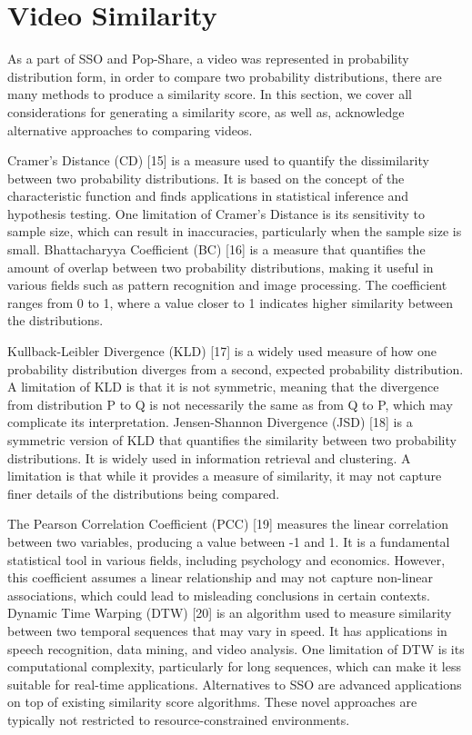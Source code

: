 \section{Video Similarity}

As a part of SSO and Pop-Share, a video was represented in probability distribution form, in order to compare two probability distributions, there are many methods to produce a similarity score. In this section, we cover all considerations for generating a similarity score, as well as, acknowledge alternative approaches to comparing videos.

Cramer’s Distance (CD) [15] is a measure used to quantify the dissimilarity between two probability distributions. It is based on the concept of the characteristic function and finds applications in statistical inference and hypothesis testing. One limitation of Cramer’s Distance is its sensitivity to sample size, which can result in inaccuracies, particularly when the sample size is small.
Bhattacharyya Coefficient (BC) [16] is a measure that quantifies the amount of overlap between two probability distributions, making it useful in various fields such as pattern recognition and image processing. The coefficient ranges from 0 to 1, where a value closer to 1 indicates higher similarity between the distributions.

Kullback-Leibler Divergence (KLD) [17] is a widely used measure of how one probability distribution diverges from a second, expected probability distribution. A limitation of KLD is that it is not symmetric, meaning that the divergence from distribution P to Q is not necessarily the same as from Q to P, which may complicate its interpretation.
Jensen-Shannon Divergence (JSD) [18] is a symmetric version of KLD that quantifies the similarity between two probability distributions. It is widely used in information retrieval and clustering. A limitation is that while it provides a measure of similarity, it may not capture finer details of the distributions being compared.

The Pearson Correlation Coefficient (PCC) [19] measures the linear correlation between two variables, producing a value between -1 and 1. It is a fundamental statistical tool in various fields, including psychology and economics. However, this coefficient assumes a linear relationship and may not capture non-linear associations, which could lead to misleading conclusions in certain contexts. 
Dynamic Time Warping (DTW) [20] is an algorithm used to measure similarity between two temporal sequences that may vary in speed. It has applications in speech recognition, data mining, and video analysis. One limitation of DTW is its computational complexity, particularly for long sequences, which can make it less suitable for real-time applications. 
Alternatives to SSO are advanced applications on top of existing similarity score algorithms. These novel approaches are typically not restricted to resource-constrained environments.

